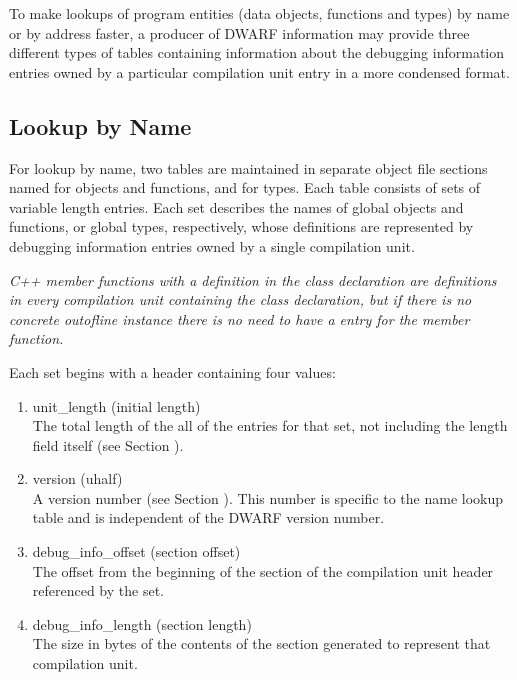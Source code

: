 To make lookups of program entities (data objects, functions
and types) by name or by address faster, a producer of DWARF
information may provide three different types of tables
containing information about the debugging information
entries owned by a particular compilation unit entry in a
more condensed format.

\subsection{Lookup by Name}

For lookup by name, two tables are maintained in separate
object file sections named 
 for objects and
functions, and 
for types. Each table consists
of sets of variable length entries. Each set describes the
names of global objects and functions, or global types,
respectively, whose definitions are represented by debugging
information entries owned by a single compilation unit.

\textit{C++ member functions with a definition in the class declaration
are definitions in every compilation unit containing the
class declaration, but if there is no concrete out\dash of\dash line
instance there is no need to have a 
 entry
for the member function.}

Each set begins with a header containing four values:
\begin{enumerate}[1.]

\item unit\_length (initial length) \\
The total length of the all of the entries for that set,
not including the length field itself 
(see Section ).

\item  version (uhalf) \\
A version number 
(see Section ). 
This number is specific
to the name lookup table and is independent of the DWARF
version number.

\item debug\_info\_offset (section offset) \\
The offset from the beginning of the 
 section of
the compilation unit header referenced by the set.

\item debug\_info\_length (section length) \\
The size in bytes of the contents of the 
 section
generated to represent that compilation unit.
\end{enumerate}

